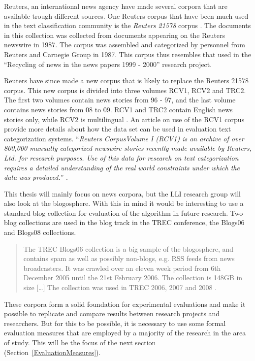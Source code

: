 Reuters, an international news agency have made several corpora that are available trough different sources. One Reuters corpus that have been much used in the text classification community is the \textit{Reuters 21578} corpus \cite{Lewis2004a}. The documents in this collection was collected from documents appearing on the Reuters newswire in 1987. The corpus was assembled and categorized by personnel from Reuters and Carnegie Group in 1987. This corpus thus resembles that used in the ``Recycling of news in the news papers 1999 - 2000'' research project.

Reuters have since made a new corpus that is likely to replace the Reuters 21578 corpus. This new corpus is divided into three volumes RCV1, RCV2 and TRC2. The first two volumes contain news stories from 96 - 97, and the last volume contains news stories from 08 to 09. RCV1 and TRC2 contain English news stories only, while RCV2 is multilingual \cite{NationalInstituteofStandardsandTechnology2004}. An article on use of the RCV1 corpus provide more details about how the data set can be used in evaluation text categorization systems. ``\textit{Reuters CorpusVolume I (RCV1) is an archive of over 800,000 manually categorized newswire stories recently made available by Reuters, Ltd. for research purposes. Use of this data for research on text categorization requires a detailed understanding of the real world constraints under which the data was produced.}'' \cite{Lewis2004}. 

This thesis will mainly focus on news corpora, but the LLI research group will also look at the blogosphere. With this in mind it would be interesting to use a standard blog collection for evaluation of the algorithm in future research. Two blog collections are used in the blog track in the TREC conference, the Blogs06 and Blogs08 collections.\begin{quote}
The TREC Blogs06 collection is a big sample of the blogosphere, and contains spam as well as possibly non-blogs, e.g. RSS feeds from news broadcasters. It was crawled over an eleven week period from 6th December 2005 until the 21st February 2006. The collection is 148GB in size [\dots] The collection was used in TREC 2006, 2007 and 2008 \cite{Macdonald2011}.
\end{quote} 

These corpora form a solid foundation for experimental evaluations and make it possible to replicate and compare results between research projects and researchers. But for this to be possible, it is necessary to use some formal evaluation measures that are employed by a majority of the research in the area of study. This will be the focus of the next section (Section~\ref{EvaluationMeasures}).

